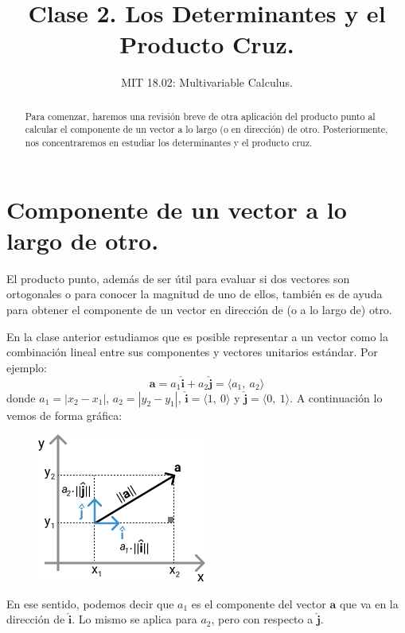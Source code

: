 \documentclass[12pt]{article}
\title{Clase 2. Los Determinantes y el Producto Cruz.}
\author{MIT 18.02: Multivariable Calculus.}
\date{}
\begin{document}
\maketitle

\begin{abstract}
\noindent Para comenzar, haremos una revisión breve de otra aplicación del producto punto al calcular el componente de un vector a lo largo (o en dirección) de otro. Posteriormente, nos concentraremos en estudiar los determinantes y el producto cruz.
\end{abstract}


\section{Componente de un vector a lo largo de otro.}

El producto punto, además de ser útil para evaluar si dos vectores son ortogonales o para conocer la magnitud de uno de ellos, también es de ayuda para obtener el componente de un vector en dirección de (o a lo largo de) otro.

En la clase anterior estudiamos que es posible representar a un vector como la combinación lineal entre sus componentes y vectores unitarios estándar. Por ejemplo:
\[
  \mathbf{a} = a_{1} \hat{\mathbf{i}} + a_{2} \hat{\mathbf{j}} = \langle a_{1}, \ a_{2} \rangle
\]
donde $a_{1} = |x_{2} - x_{1}|$, $a_{2} = |y_{2} - y_{1}|$, $\hat{\mathbf{i}} = \langle 1, \ 0 \rangle$ y $\hat{\mathbf{j}} = \langle 0, \ 1 \rangle$. A continuación lo vemos de forma gráfica:

\begin{figure}[hbt!]
\centering
\includegraphics[scale=0.7]{img/vect-along-other-1.jpg}
\end{figure}

En ese sentido, podemos decir que $a_{1}$ es el componente del vector $\mathbf{a}$ que va en la dirección de $\hat{\mathbf{i}}$. Lo mismo se aplica para $a_{2}$, pero con respecto a $\hat{\mathbf{j}}$.
\end{document}
